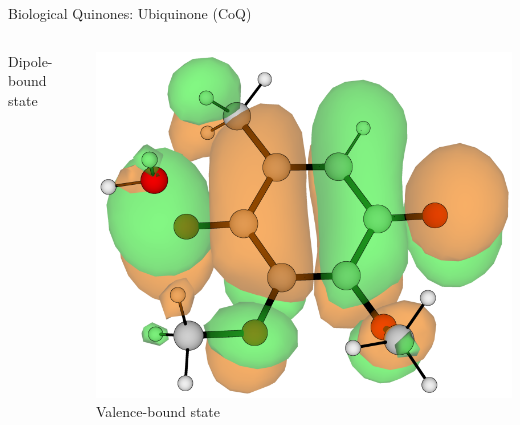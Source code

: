 \documentclass[9pt,t,xcolor=table]{beamer}
\begin{document}
\begin{frame}{\huge Biological Quinones: Ubiquinone (CoQ)}
\begin{columns}[b]
\begin{column}[b]{0.25\textwidth}
				\vspace{10pt}
				\small Dipole-bound state
			\end{column}
			\begin{column}[b]{0.25\textwidth}
				\centering
				\includegraphics[width=\textwidth]{Figs/Q0_H2O_VBS.png}\\
				\vspace{25pt}
				\small Valence-bound state
			\end{column}
		\end{columns}
\end{frame}
\end{document}
